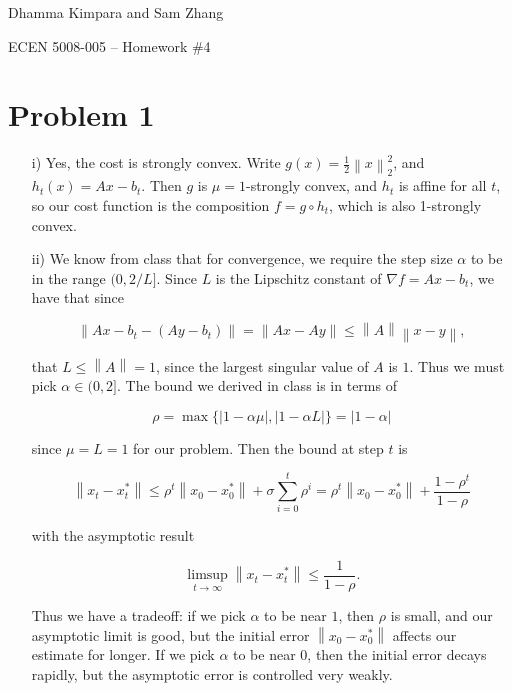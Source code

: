 \documentclass[12pt]{article}
\newcommand{\abs}[1]{\left\lvert#1\right\rvert}
\newcommand{\norm}[1]{\left\lVert#1\right\rVert}
\begin{document}
\begin{flushright}
    Dhamma Kimpara and Sam Zhang

    ECEN 5008-005 -- Homework \#4
\end{flushright}

\section*{Problem 1}%
\label{sec:Problem 1}

\begin{enumerate}
    \item [i)] Yes, the cost is strongly convex. Write $g(x) = \frac{1}{2}\norm{x}_2^2$, and $h_t(x) = Ax - b_t$. Then $g$ is $\mu=1$-strongly convex, and $h_t$ is affine for all $t$, so our cost function is the composition $f = g \circ h_t$, which is also 1-strongly convex.

    \item[ii)] We know from class that for convergence, we require the step size $\alpha$ to be in the range $(0, 2/L]$. Since $L$ is the Lipschitz constant of $\nabla f = Ax - b_t$, we have that since

        \begin{equation*}
            \norm{Ax - b_t - (Ay - b_t)} = \norm{Ax - Ay} \le \norm{A} \norm{x - y},
        \end{equation*}

        that $L \le \norm{A} = 1$, since the largest singular value of $A$ is $1$. Thus we must pick $\alpha \in (0, 2]$. The bound we derived in class is in terms of

        \begin{equation*}
            \rho = \max \lbrace \abs{ 1 - \alpha \mu}, \abs{ 1 - \alpha L } \rbrace = \abs{ 1 - \alpha}
        \end{equation*}

        since $\mu = L = 1$ for our problem. Then the bound at step $t$ is

        \begin{equation*}
            \norm{x_t - x_t^*} \le \rho^t \norm{x_0 - x_0^*} + \sigma \sum_{i=0}^t \rho^i = \rho^t \norm{x_0 - x_0^*} + \frac{1 - \rho^{t}}{1-\rho}
        \end{equation*}

        with the asymptotic result

        \begin{equation*}
            \limsup_{t \to \infty} \norm{x_t - x_t^*} \le \frac{1}{1 - \rho}.
        \end{equation*}

        Thus we have a tradeoff: if we pick $\alpha$ to be near $1$, then $\rho$ is small, and our asymptotic limit is good, but the initial error $\norm{x_0 - x_0^*}$ affects our estimate for longer. If we pick $\alpha$ to be near $0$, then the initial error decays rapidly, but the asymptotic error is controlled very weakly.

\end{enumerate}
\end{document}
